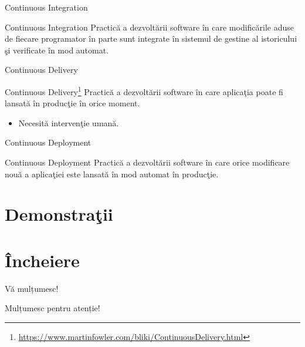 \documentclass[presentation]{beamer}
\begin{document}
\begin{frame}[label={sec:orgb37709b}]{Continuous Integration}
\begin{block}{Continuous Integration}
\vskip 0.1in
Practică a dezvoltării software în care modificările aduse de fiecare programator în parte sunt integrate în sistemul de gestine al istoricului şi verificate în mod automat.
\end{block}
\end{frame}
\begin{frame}[label={sec:orgcb5eba5}]{Continuous Delivery}
\begin{block}{Continuous Delivery\footnote{\url{https://www.martinfowler.com/bliki/ContinuousDelivery.html}}}
\vskip 0.1in
Practică a dezvoltării software în care aplicaţia poate fi lansată în producţie în orice moment.
\begin{itemize}
\item Necesită intervenţie umană.
\end{itemize}
\end{block}
\end{frame}
\begin{frame}[label={sec:orge524b82}]{Continuous Deployment}
\begin{block}{Continuous Deployment}
\vskip 0.1in
Practică a dezvoltării software în care orice modificare nouă a aplicaţiei este lansată în mod automat în producţie.
\end{block}
\end{frame}
\section{Demonstraţii}
\label{sec:org54aa1a9}
\section{Încheiere}
\label{sec:orga70d0bb}
\begin{frame}[label={sec:org3fb56ab}]{Vă mulțumesc!}
\begin{center}
Mulțumesc pentru atenție!
\end{center}
\end{frame}
\end{document}
